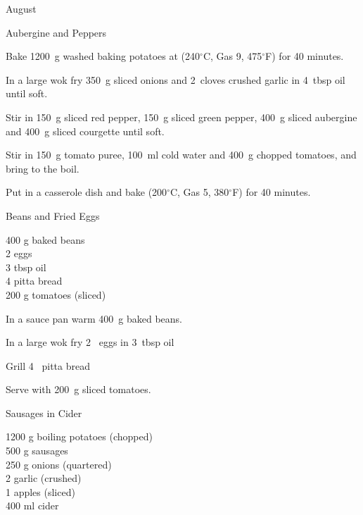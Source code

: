 \begin{menu}{August}
\begin{recipe}{2}{Aubergine and Peppers}
    \begin{instructions}
    \item 
      Bake 
      1200~g washed baking potatoes
      at
      (240$^{\circ}$C, Gas 9, 475$^{\circ}$F) for 40 minutes.
    \item 
        In a large wok fry
        350~g sliced onions
        and
        2~cloves crushed garlic
        in
        4~tbsp  oil
        until soft.
      \item 
        Stir in
        150~g sliced red pepper,
        150~g sliced green pepper,
        400~g sliced aubergine
        and
        400~g sliced courgette
        until soft.
      \item 
        Stir in
        150~g  tomato puree,
        100~ml  cold water
        and
        400~g chopped tomatoes,
        and bring to the boil.
      \item 
        Put in a casserole dish and bake (200$^{\circ}$C, Gas 5, 380$^{\circ}$F) for 40 minutes.
      
    \end{instructions}
    \end{recipe}%
  
    \begin{recipe}{1}{Beans and Fried Eggs}%
		\begin{ingredients}
		400 g baked beans  \\
	2  eggs  \\
	3 tbsp oil  \\
	4  pitta bread  \\
	200 g tomatoes (sliced) \\
	
		\end{ingredients}
	
    \begin{instructions}
    \item 
        In a sauce pan warm
        400~g  baked beans.
      \item 
        In a large wok fry
        2~  eggs
        in
        3~tbsp  oil\item 
        Grill
        4~  pitta bread\item 
        Serve with 200~g sliced tomatoes.
      
    \end{instructions}
    \end{recipe}%
  
    \begin{recipe}{2}{Sausages in Cider}%
		\begin{ingredients}
		1200 g boiling potatoes (chopped) \\
	500 g sausages  \\
	250 g onions (quartered) \\
	2  garlic (crushed) \\
	1  apples (sliced) \\
	400 ml cider  \\
	

\end{ingredients}
\end{recipe}
\end{menu}
